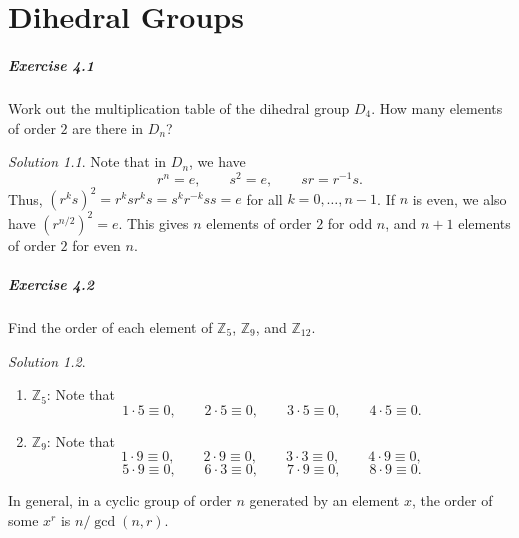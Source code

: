 \documentclass[11pt]{report}
\def\Z{\mathbb{Z}}
\theoremstyle{remark}
\newtheorem*{solution}{Solution}
\begin{document}
    \chapter{Dihedral Groups}

    \paragraph{Exercise 4.1} Work out the multiplication table of the dihedral group
    $D_4$. How many elements of order $2$ are there in $D_n$?
    \begin{solution} \mbox{}
        Note that in $D_n$, we have \[
            r^n = e, \qquad s^2 = e, \qquad sr = r^{-1}s.
        \] Thus, $(r^ks)^2 = r^ksr^ks = s^kr^{-k}ss = e$ for all $k = 0, \dots, n -
        1$. If $n$ is even, we also have $(r^{n / 2})^2 = e$. This gives $n$
        elements of order $2$ for odd $n$, and $n + 1$ elements of order $2$ for
        even $n$.
    \end{solution}

    \paragraph{Exercise 4.2} Find the order of each element of $\Z_5$, $\Z_9$, and
    $\Z_{12}$.
    \begin{solution} \mbox{}
    \begin{enumerate}
        \item $\Z_5$: Note that \[
            1\cdot 5 \equiv 0, \qquad
            2\cdot 5 \equiv 0, \qquad
            3\cdot 5 \equiv 0, \qquad
            4\cdot 5 \equiv 0.
        \] 
        \item $\Z_9$: Note that \[
            1\cdot 9 \equiv 0, \qquad
            2\cdot 9 \equiv 0, \qquad
            3\cdot 3 \equiv 0, \qquad
            4\cdot 9 \equiv 0, \] \[
            5\cdot 9 \equiv 0, \qquad
            6\cdot 3 \equiv 0, \qquad
            7\cdot 9 \equiv 0, \qquad
            8\cdot 9 \equiv 0.
        \] 
    \end{enumerate}
    In general, in a cyclic group of order $n$ generated by an element $x$, the
    order of some $x^r$ is $n / \gcd(n, r)$.
    \end{solution}
\end{document}
